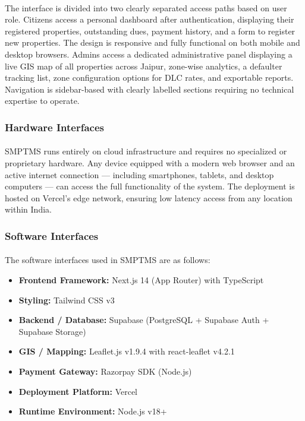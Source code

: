 \paragraph{}The interface is divided into two clearly separated access paths based on user role. Citizens access a personal dashboard after authentication, displaying their registered properties, outstanding dues, payment history, and a form to register new properties. The design is responsive and fully functional on both mobile and desktop browsers. Admins access a dedicated administrative panel displaying a live GIS map of all properties across Jaipur, zone-wise analytics, a defaulter tracking list, zone configuration options for DLC rates, and exportable reports. Navigation is sidebar-based with clearly labelled sections requiring no technical expertise to operate.

\subsubsection{Hardware Interfaces}
\paragraph{}SMPTMS runs entirely on cloud infrastructure and requires no specialized or proprietary hardware. Any device equipped with a modern web browser and an active internet connection --- including smartphones, tablets, and desktop computers --- can access the full functionality of the system. The deployment is hosted on Vercel's edge network, ensuring low latency access from any location within India.

\subsubsection{Software Interfaces}
\paragraph{}The software interfaces used in SMPTMS are as follows:
\begin{itemize}
    \item \textbf{Frontend Framework:} Next.js 14 (App Router) with TypeScript
    \item \textbf{Styling:} Tailwind CSS v3
    \item \textbf{Backend / Database:} Supabase (PostgreSQL + Supabase Auth + Supabase Storage)
    \item \textbf{GIS / Mapping:} Leaflet.js v1.9.4 with react-leaflet v4.2.1
    \item \textbf{Payment Gateway:} Razorpay SDK (Node.js)
    \item \textbf{Deployment Platform:} Vercel
    \item \textbf{Runtime Environment:} Node.js v18+
\end{itemize}

